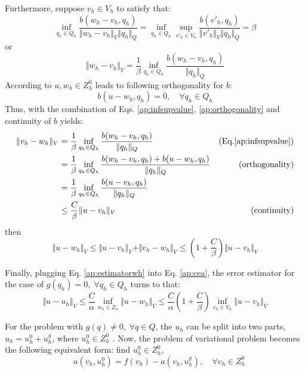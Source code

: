 Furthermore, suppose $v_h \in V_h$ to satisfy that:
\begin{equation}
\inf_{q_h \in Q_h} \frac{b(w_h-v_h,q_h)}{\Vert w_h-v_h \Vert_V \Vert q_h \Vert_Q} =
\inf_{q_h \in Q_h} \sup_{v'_h \in V_h} \frac{b(v'_h,q_h)}{\Vert v'_h \Vert_V \Vert q_h \Vert_Q} = \beta
\end{equation}
or
\begin{equation}\label{ap:infsupvalue}
\Vert w_h-v_h \Vert_V =\frac{1}{\beta} \inf_{q_h \in Q_h} \frac{b(w_h-v_h,q_h)}{\Vert q_h \Vert_Q}
\end{equation}
According to $u, w_h\in Z^0_h$ leads to following orthogonality for $b$:
\begin{equation}\label{ap:orthogonality}
b(u-w_h,q_h) = 0 ,\quad \forall q_h \in Q_h
\end{equation}
Thus, with the combination of Eqs. \eqref{ap:infsupvalue}, \eqref{ap:orthogonality} and continuity of $b$ yields:
\begin{equation}\label{ap:r3}
\begin{aligned}
    \Vert v_h - w_h \Vert_V &=\frac{1}{\beta} \inf_{q_h \in Q_h} \frac{b(w_h-v_h,q_h)}{\Vert q_h \Vert_Q} & \textrm{(Eq.}\eqref{ap:infsupvalue} \textrm{)} \\
    &=\frac{1}{\beta} \inf_{q_h \in Q_h} \frac{b(w_h-v_h,q_h) + b(u-w_h,q_h)}{\Vert q_h \Vert_Q} & \textrm{(orthogonality)}\\
&=\frac{1}{\beta}\inf_{q_h \in Q_h} \frac{b(u-v_h,q_h)}{\Vert q_h \Vert_Q} & \\
&\le\frac{C}{\beta} \Vert u-v_h \Vert_V & \textrm{(continuity)}
\end{aligned}
\end{equation}
then
\begin{equation}\label{ap:estimatorwh}
    \Vert u-w_h \Vert_V \le \Vert u-v_h \Vert_V + \Vert v_h-w_h \Vert_V \le (1+\frac{C}{\beta})\Vert u-v_h \Vert_V 
\end{equation}

Finally, plugging Eq. \eqref{ap:estimatorwh} into Eq. \eqref{ap:cea}, the error estimator for the case of $g(q_h)=0, \; \forall q_h \in Q_h$ turns to that:
\begin{equation}\label{ap:estimator1}
\Vert u-u_h \Vert_V \le \frac{C}{\alpha} \inf_{w_h \in Z_h}\Vert u-w_h \Vert_V\le \frac{C}{\alpha} (1+\frac{C}{\beta}) \inf_{v_h \in V_h} \Vert u-v_h \Vert_V
\end{equation}

For the problem with $g(q)\ne0,\; \forall q \in Q$, the $u_h$ can be split into two parts, $u_h=u^0_h + u^g_h$, where $u^0_h \in Z^0_h$ \cite{arnold1987}. Now, the problem of variational problem becomes the following equivalent form: find $u^0_h \in Z^0_h$,
\begin{equation} \label{ap:r2}
\quad a(v_h,u^0_h) = f(v_h) - a(v_h,u^g_h), \quad \forall v_h \in Z^0_h
\end{equation}


